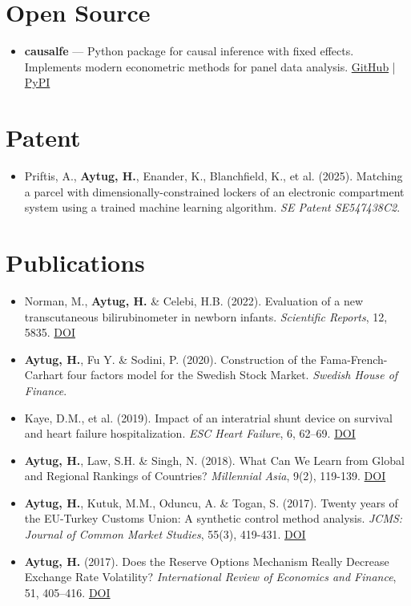 \documentclass[11pt,a4paper,sans]{moderncv}
\begin{document}
\section{Open Source}
{\begin{itemize}[label=\textbullet]
\item {\textbf{causalfe} — Python package for causal inference with fixed effects. Implements modern econometric methods for panel data analysis. \color{blue}\href{https://github.com/haytug/causalfe}{GitHub} | \href{https://pypi.org/project/causalfe/}{PyPI}}
\end{itemize}}

\section{Patent}
{\begin{itemize}[label=\textbullet]
\item Priftis, A., \textbf{Aytug, H.}, Enander, K., Blanchfield, K., et al. (2025). Matching a parcel with dimensionally-constrained lockers of an electronic compartment system using a trained machine learning algorithm. \textit{SE Patent SE547438C2}.
\end{itemize}}

\section{Publications}
{\begin{itemize}[label=\textbullet]
\item Norman, M., \textbf{Aytug, H.} \& Celebi, H.B. (2022). Evaluation of a new transcutaneous bilirubinometer in newborn infants. \textit{Scientific Reports}, 12, 5835. {\color{blue}\href{https://doi.org/10.1038/s41598-022-09788-4}{DOI}}
\item \textbf{Aytug, H.}, Fu Y. \& Sodini, P. (2020). Construction of the Fama-French-Carhart four factors model for the Swedish Stock Market. \textit{Swedish House of Finance}.
\item Kaye, D.M., et al. (2019). Impact of an interatrial shunt device on survival and heart failure hospitalization. \textit{ESC Heart Failure}, 6, 62–69. {\color{blue}\href{https://doi.org/10.1002/ehf2.12350}{DOI}}
\item \textbf{Aytug, H.}, Law, S.H. \& Singh, N. (2018). What Can We Learn from Global and Regional Rankings of Countries? \textit{Millennial Asia}, 9(2), 119-139. {\color{blue}\href{https://doi.org/10.1177/0976399618786292}{DOI}}
\item \textbf{Aytug, H.}, Kutuk, M.M., Oduncu, A. \& Togan, S. (2017). Twenty years of the EU-Turkey Customs Union: A synthetic control method analysis. \textit{JCMS: Journal of Common Market Studies}, 55(3), 419-431. {\color{blue}\href{https://doi.org/10.1111/jcms.12490}{DOI}}
\item \textbf{Aytug, H.} (2017). Does the Reserve Options Mechanism Really Decrease Exchange Rate Volatility? \textit{International Review of Economics and Finance}, 51, 405–416. {\color{blue}\href{https://doi.org/10.1016/j.iref.2017.07.004}{DOI}}
\end{itemize}}
\end{document}
